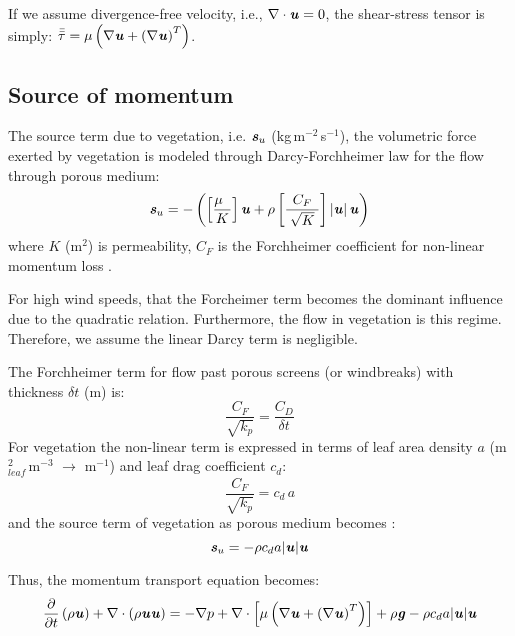 \begin{assumption}
	If we assume divergence-free velocity, i.e., $\nabla \cdot \textbf{\textit{u}} = 0$, the shear-stress tensor is simply: $\bar{\bar{{\tau}}} = \mu \left( \nabla \textbf{\textit{u}} + \left(\nabla \textbf{\textit{u}} \right)^T \right)$.
\end{assumption}

\subsection{Source of momentum}

The source term due to vegetation, i.e. $\textbf{\textit{s}}_u$ (kg\,m$^{-2}$\,s$^{-1}$), the volumetric force exerted by vegetation is modeled through Darcy-Forchheimer law for the flow through porous medium:
\begin{equation}
\textbf{\textit{s}}_u =  - \left( {\left[ {\frac{{{\mu}\;\;}}{K}} \right]{\textbf{\textit{u}}} + {\rho}\left[ {\frac{{{C_F}}}{{\;\sqrt K \;}}} \right]\left| {\textbf{\textit{u}}} \right|{\textbf{\textit{u}}}} \right)
\label{eq:darcyforchheimer}
\end{equation}
where $K$ (m$^{2}$) is permeability, $C_F$ is the Forchheimer coefficient for non-linear momentum loss \citep{Verboven2006,Boulard2008}.

\begin{assumption}
	For high wind speeds, that the Forcheimer term becomes the dominant influence due to the quadratic relation. Furthermore, the flow in vegetation is this regime. Therefore, we assume the linear Darcy term is negligible. 
\end{assumption}

The Forchheimer term for flow past porous screens (or windbreaks) with thickness $\delta t$ (m) is: 
\begin{equation}
\frac{{{C_F}}}{{\sqrt {{k_p}} }} = \frac{{{C_D}}}{{\delta t}}
\end{equation}
For vegetation the non-linear term is expressed in terms of leaf area density $a$ (m$^2_{\textit{leaf}}$\,m$^{-3}$ $\rightarrow$ m$^{-1}$) and leaf drag coefficient $c_d$:
\begin{equation}
\frac{{{C_F}}}{{\sqrt {{k_p}} }} = c_d\,a
\end{equation}
and the source term of vegetation as porous medium becomes \citep{Wilson1977,Liu1996,Hiraoka,Kenjeres2013}:
\begin{equation}
\textbf{\textit{s}}_u = - \rho c_d a |\textbf{\textit{u}}| \textbf{\textit{u}}
\end{equation}

Thus, the momentum transport equation becomes:
\begin{equation}
\frac{\partial}{\partial t} \left(\rho \textbf{\textit{u}} \right) + \nabla \cdot \left(\rho \textbf{\textit{u}}\textbf{\textit{u}} \right) = - \nabla p + \nabla \cdot \left[ \mu \left( \nabla \textbf{\textit{u}} + \left(\nabla \textbf{\textit{u}} \right)^T \right) \right] + \rho \textbf{\textit{g}} - \rho c_d a |\textbf{\textit{u}}| \textbf{\textit{u}}
\end{equation}

